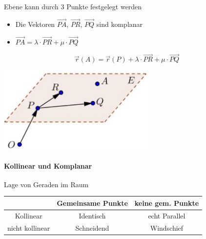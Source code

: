 \begin{definition}{Ebene}
    kann durch 3 Punkte festgelegt werden\\
    \begin{minipage}{0.65\linewidth}
    \begin{itemize}
        \item Die Vektoren $\overrightarrow{PA}$, $\overrightarrow{PR}$, $\overrightarrow{PQ}$ sind komplanar
        \item $\overrightarrow{PA} = \lambda \cdot \overrightarrow{PR} + \mu \cdot \overrightarrow{PQ}$
    \end{itemize}
    $$\overrightarrow{r}(A) = \overrightarrow{r}(P) + \lambda \cdot \overrightarrow{PR} + \mu \cdot \overrightarrow{PQ}$$
    \end{minipage}
    \begin{minipage}{0.3\linewidth}
        \includegraphics[width=1\linewidth]{ebene.png}
    \end{minipage}
\end{definition}

\paragraph*{Kollinear und Komplanar}   

\begin{theorem}{Lage} von Geraden im Raum\\
    \vspace*{2mm}
    \begin{tabular}{c|c|c|}
        & Gemeinsame Punkte & keine gem. Punkte \\
        \hline
        Kollinear & Identisch & echt Parallel \\
        \hline
        nicht kollinear & Schneidend & Windschief \\
        \hline
    \end{tabular}
\end{theorem}

